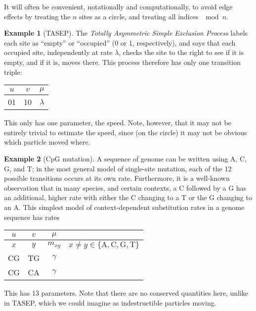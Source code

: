 \documentclass{article}
\newcommand{\nA}{\mbox{A}}  %
\newcommand{\nC}{\mbox{C}}
\newcommand{\nG}{\mbox{G}}
\newcommand{\nT}{\mbox{T}}
\theoremstyle{plain}
\theoremstyle{definition}
\newtheorem{example}{Example}[section]
\begin{document}
It will often be convenient, notationally and computationally, to avoid edge effects
by treating the $n$ sites as a circle, and treating all indices $\mod n$.

\begin{example}[TASEP]
  The \emph{Totally Asymmetric Simple Exclusion Process} labels each site as ``empty'' or ``occupied'' (0 or 1, respectively), 
  and says that each occupied site, independently at rate $\lambda$, checks the site to the right to see if it is empty,
  and if it is, moves there.  
  This process therefore has only one transition triple:

  \begin{center}
    \begin{tabular}{c@{\quad$\to$\quad}c@{\quad at rate\quad }c}
      $u$  &  $v$  &  $\mu$  \\
      \hline
      01  &   10   &  $\lambda$
    \end{tabular}
  \end{center}

  This only has one parameter, the speed.  
  Note, however, that it may not be entirely trivial to estimate the speed,
  since (on the circle) it may not be obvious which particle moved where.

\end{example}

\begin{example}[CpG mutation]
  A sequence of genome can be written using A, C, G, and T;
  in the most general model of single-site mutation, each of the 12 possible transitions occurs at its own rate.
  Furthermore, it is a well-known observation that in many species, and certain contexts, 
  a C followed by a G has an additional, higher rate with either the C changing to a T or the G changing to an A.
  This simplest model of context-dependent substitution rates in a genome sequence has rates

  \begin{center}
    \begin{tabular}{c@{\quad$\to$\quad}c@{\quad at rate\quad }cc}
      $u$  &  $v$  &  $\mu$  & \\
      \hline
      $x$  &  $y$  &  $m_{xy}$ & \qquad $x \neq y \in \{\nA,\nC,\nG,\nT\}$  \\
      CG   &  TG   &  $\gamma$ & \\
      CG   &  CA   &  $\gamma$ &  
    \end{tabular}
  \end{center}

  This has 13 parameters.
  Note that there are no conserved quantities here, unlike in TASEP,
  which we could imagine as indestructible particles moving.


\end{example}
\end{document}
